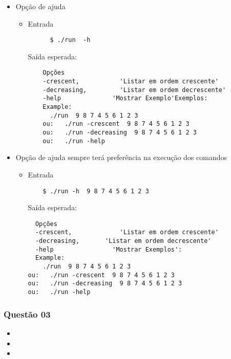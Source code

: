 \documentclass[11pt,a4paper]{article}
\begin{document}
\begin{itemize}
  \item Opção de ajuda
  \begin{itemize}
    \item Entrada
    \begin{verbatim}
      $ ./run  -h
    \end{verbatim}
    Saída esperada:
    \begin{verbatim}
    Opções
    -crescent, 			 'Listar em ordem crescente'
    -decreasing, 		 'Listar em ordem decrescente'
    -help 		       'Mostrar Exemplo'Exemplos:
    Example:
      ./run  9 8 7 4 5 6 1 2 3
	ou:   ./run -crescent  9 8 7 4 5 6 1 2 3
	ou:	  ./run -decreasing  9 8 7 4 5 6 1 2 3
	ou:	  ./run -help
\end{verbatim}
\end{itemize}


\item Opção de ajuda sempre terá preferência na execução dos comandos
\begin{itemize}
  \item Entrada
  \begin{verbatim}
    $ ./run -h  9 8 7 4 5 6 1 2 3
  \end{verbatim}
  Saída esperada:
  \begin{verbatim}
  Opções
  -crescent, 			 'Listar em ordem crescente'
  -decreasing, 		 'Listar em ordem decrescente'
  -help 		       'Mostrar Exemplos':
  Example:
    ./run  9 8 7 4 5 6 1 2 3
ou:   ./run -crescent  9 8 7 4 5 6 1 2 3
ou:	  ./run -decreasing  9 8 7 4 5 6 1 2 3
ou:	  ./run -help
\end{verbatim}
\end{itemize}




\end{itemize}

\subsubsection{Questão 03}
\begin{itemize}
  \item
  \item
  \item
\end{itemize}
\end{document}
